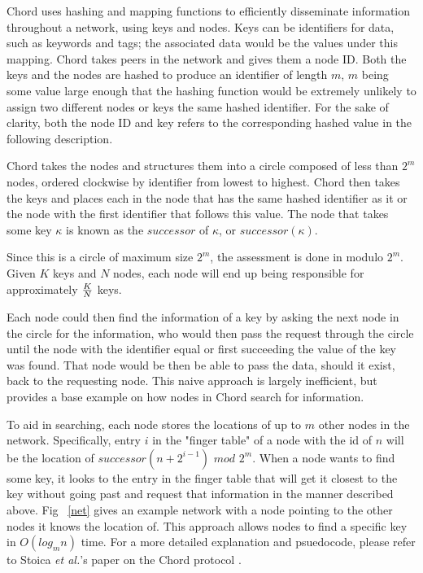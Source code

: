 \documentclass[10pt, conference, compsocconf, letterpaper]{IEEEtran}
\begin{document}
Chord uses hashing and mapping functions to efficiently disseminate information throughout a network, using keys and nodes.  Keys can be identifiers for data, such as keywords and tags; the associated data would be the values under this mapping.  Chord takes peers in the network and gives them a node ID.  Both the keys and the nodes are hashed to produce an identifier of length $m$, $m$ being some value large enough that the hashing function would be extremely unlikely to assign two different nodes or keys the same hashed identifier.  For the sake of clarity, both the node ID and key refers to the corresponding hashed value in the following description.

Chord takes the nodes and structures them into a circle composed of less than $2^m$ nodes, ordered clockwise by identifier from lowest to highest.  Chord then takes the keys and places each in the node that has the same hashed identifier as it or the node with the first identifier that follows this value.  The node that takes some key $\kappa$ is known as the $successor$ of $\kappa$, or $successor(\kappa)$.  

Since this is a circle of maximum size $2^m$, the assessment is done in modulo $2^m$.  Given $K$ keys and $N$ nodes, each node will end up being responsible for approximately \(K\over N\) keys.

Each node could then find  the information of a key by asking the next node in the circle for the information, who would then pass the request through the circle until the node with the identifier equal or first succeeding the value of the key was found.  That node would be then be able to pass the data, should it exist, back to the requesting node.  This naive approach is largely inefficient, but provides a base example on how nodes in Chord search for information.

To aid in searching, each node stores the locations of up to $m$ other nodes in the network.  Specifically, entry $i$ in the "finger table" of a node with the id of $n$ will be the location of $successor(n+2^{i-1})$ $mod$ $2^m$. When a node wants to find some key, it looks to the entry in the finger table that will get it closest to the key without going past and request that information in the manner described above.  Fig ~\ref{net} \cite{Chordpic} gives an example network with a node pointing to the other nodes it knows the location of. This approach allows nodes to find a specific key in $O(log_mn)$ time.  For a more detailed explanation and psuedocode, please refer to Stoica \emph{et al.}'s paper on the Chord protocol \cite{Chord}.
\end{document}
